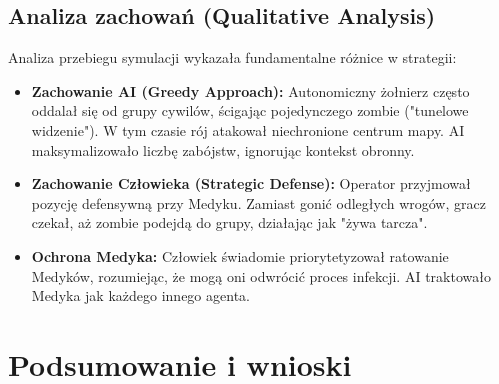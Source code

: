 \documentclass[12pt,a4paper]{article}
\begin{document}
\subsection{Analiza zachowań (Qualitative Analysis)}

Analiza przebiegu symulacji wykazała fundamentalne różnice w strategii:

\begin{itemize}
    \item \textbf{Zachowanie AI (Greedy Approach):} Autonomiczny żołnierz często oddalał się od grupy cywilów, ścigając pojedynczego zombie ("tunelowe widzenie"). W tym czasie rój atakował niechronione centrum mapy. AI maksymalizowało liczbę zabójstw, ignorując kontekst obronny.
    \item \textbf{Zachowanie Człowieka (Strategic Defense):} Operator przyjmował pozycję defensywną przy Medyku. Zamiast gonić odległych wrogów, gracz czekał, aż zombie podejdą do grupy, działając jak "żywa tarcza".
    \item \textbf{Ochrona Medyka:} Człowiek świadomie priorytetyzował ratowanie Medyków, rozumiejąc, że mogą oni odwrócić proces infekcji. AI traktowało Medyka jak każdego innego agenta.
\end{itemize}

\newpage

\section{Podsumowanie i wnioski}
\end{document}
